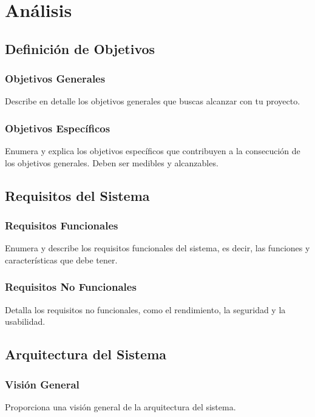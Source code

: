
\section{Análisis}

\subsection{Definición de Objetivos}

\subsubsection{Objetivos Generales}
Describe en detalle los objetivos generales que buscas alcanzar con tu proyecto.

\subsubsection{Objetivos Específicos}
Enumera y explica los objetivos específicos que contribuyen a la consecución de los objetivos generales. Deben ser medibles y alcanzables.

\subsection{Requisitos del Sistema}

\subsubsection{Requisitos Funcionales}
Enumera y describe los requisitos funcionales del sistema, es decir, las funciones y características que debe tener.

\subsubsection{Requisitos No Funcionales}
Detalla los requisitos no funcionales, como el rendimiento, la seguridad y la usabilidad.

\subsection{Arquitectura del Sistema}

\subsubsection{Visión General}
Proporciona una visión general de la arquitectura del sistema.

